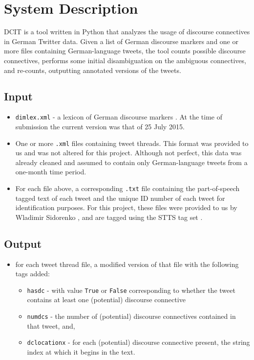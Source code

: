 \documentclass[11pt]{article}
\def\mono#1{\texttt{#1}}  %
\begin{document}
\section{System Description}
DCIT is a tool written in Python that analyzes the usage of discourse connectives in German Twitter data.  Given a list of German discourse markers and one or more files containing German-language tweets, the tool counts possible discourse connectives, performs some initial disambiguation on the ambiguous connectives, and re-counts, outputting annotated versions of the tweets.

\subsection{Input}
\begin{itemize} 

\item \mono{dimlex.xml} - a lexicon of German discourse markers \cite{dimlex}.  At the time of submission the current version was that of 25 July 2015.

\item One or more \mono{.xml} files containing tweet threads.  This format was provided to us and was not altered for this project.  Although not perfect, this data was already cleaned and assumed to contain only German-language tweets from a one-month time period.

\item For each file above, a corresponding \mono{.txt} file containing the part-of-speech tagged text of each tweet and the unique ID number of each tweet for identification purposes.  For this project, these files were provided to us by Wladimir Sidorenko \cite{WladimirSidorenko}, and are tagged using the STTS tag set \cite{stts}.
\end{itemize}

\subsection{Output}
\begin{itemize} 

\item for each tweet thread file, a modified version of that file with the following tags added:
\begin{itemize} 

\item  \mono{has\textunderscore dc} - with value \mono{True} or \mono{False} corresponding to whether the tweet contains at least one (potential) discourse connective
\item  \mono{num\textunderscore dcs} - the number of (potential) discourse connectives contained in that tweet, and,
\item  \mono{dc\textunderscore location\textunderscore x} - for each (potential) discourse connective present, the string index at which it begins in the text.

\end{itemize} %

\end{itemize} %
\end{document}
